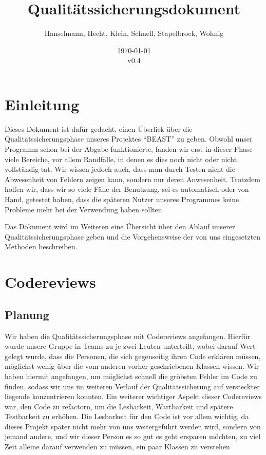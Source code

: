 \documentclass[a4paper]{scrreprt}
\begin{document}
\title{Qualitätssicherungsdokument}
\author{Hanselmann, Hecht, Klein, Schnell, Stapelbroek, Wohnig}
\date{\today\\v0.4}
\maketitle 
\tableofcontents	

\chapter{Einleitung}
Dieses Dokument ist dafür gedacht, einen Überlick über die
Qualitätssicherungsphase unseres Projektes "`BEAST"' zu geben. Obwohl unser
Programm schon bei der Abgabe funktionierte, fanden wir erst in dieser Phase
viele Bereiche, vor allem Randfälle, in denen es dies noch nicht oder nicht
vollständig tat.
Wir wissen jedoch auch, dass man durch Testen nicht die Abwesenheit von Fehlern
zeigen kann, sondern nur deren Anwesenheit. Trotzdem hoffen wir, dass wir
so viele Fälle der Benutzung, sei es automatisch oder von Hand, getestet haben,
dass die späteren Nutzer unseres Programmes keine Probleme mehr bei der
Verwendung haben sollten

Das Dokument wird im Weiteren eine Übersicht über den Ablauf unserer Qualitäts\-sicherungsphase geben und die Vorgehensweise der von uns eingesetzten
Methoden beschreiben.

\chapter{Codereviews}

\section{Planung}
Wir haben die Qualitätssicherungsphase mit Codereviews angefangen.
Hierfür wurde unsere Gruppe in Teams zu je zwei Leuten unterteilt, wobei
darauf Wert gelegt wurde, dass die Personen, die sich gegenseitig ihren Code
erklären müssen, möglichst wenig über die vom anderen vorher geschriebenen
Klassen wissen.
\newline
Wir haben hiermit
angefangen, um möglichst schnell die gröbsten Fehler im Code zu finden, sodass
wir uns im weiteren Verlauf der Qualitätssicherung auf versteckter liegende konzentrieren
konnten. Ein weiterer wichtiger Aspekt dieser Codereviews war, den Code zu
refactorn, um die Lesbarkeit, Wartbarkeit und spätere Testbarkeit zu erhöhen.
\newline
Die Lesbarkeit für den Code ist vor allem wichtig, da dieses Projekt später
nicht mehr von uns weitergeführt werden wird, sondern von jemand andere, und wir
dieser Person es so gut es geht ersparen möchten, zu viel Zeit alleine darauf
verwenden zu müssen, ein paar Klassen zu verstehen
\end{document}

